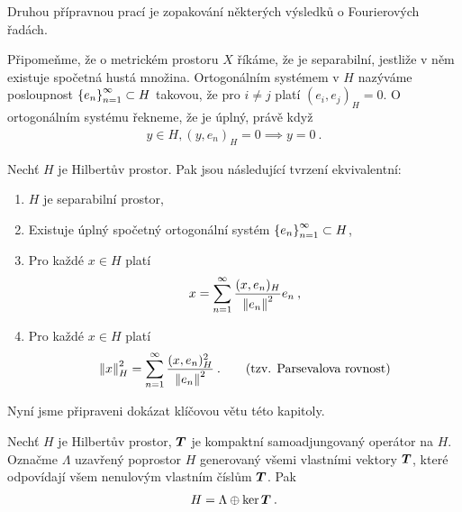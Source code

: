 Druhou přípravnou prací je zopakování některých výsledků o Fourierových řadách.

Připomeňme, že o metrickém prostoru $X$ říkáme, že je separabilní, jestliže v něm existuje spočetná hustá množina. Ortogonálním systémem v $H$ nazýváme posloupnost $\left \lbrace e_n \right \rbrace_{n=1}^\infty \subset H$ takovou, že pro $i\neq j$ platí $(e_i,e_j)_H =0$. O ortogonálním systému řekneme, že je úplný, právě když \begin{align*}
    y \in H, (y,e_n)_H =0 \implies y = 0 \:.
\end{align*}

\begin{theorem} \label{4.fourier}
Nechť $H$ je Hilbertův prostor. Pak jsou následující tvrzení ekvivalentní: \begin{enumerate}
    \item $H$ je separabilní prostor,
    \item Existuje úplný spočetný ortogonální systém $\left \lbrace e_n \right \rbrace_{n=1}^\infty \subset H$,
    \item Pro každé $x \in H$ platí \begin{align*}
        x = \sum_{n=1}^\infty \dfrac{(x,e_n)_H}{\left\lVert e_n\right\rVert^2} e_n \:,
    \end{align*}
    \item Pro každé $x \in H$ platí \begin{align*}
        \left\lVert x\right\rVert_H^2 = \sum_{n=1}^\infty \dfrac{(x,e_n)^2_H}{\left\lVert e_n\right\rVert^2} \:. \qquad \text{(tzv. Parsevalova rovnost)}
    \end{align*}
\end{enumerate}
\end{theorem}

Nyní jsme připraveni dokázat klíčovou větu této kapitoly.
\begin{theorem} \label{4.Hilbert-Schmidt}
Nechť $H$ je Hilbertův prostor, $\boldsymbol{T}$ je kompaktní samoadjungovaný operátor na $H$. Označme $\Lambda$ uzavřený poprostor $H$ generovaný všemi vlastními vektory $\boldsymbol{T}$, které odpovídají všem nenulovým vlastním číslům $\boldsymbol{T}$. Pak \begin{align*}
    H = \Lambda \oplus \mathrm{ker}\, \boldsymbol{T} \:.
\end{align*}
\end{theorem}

